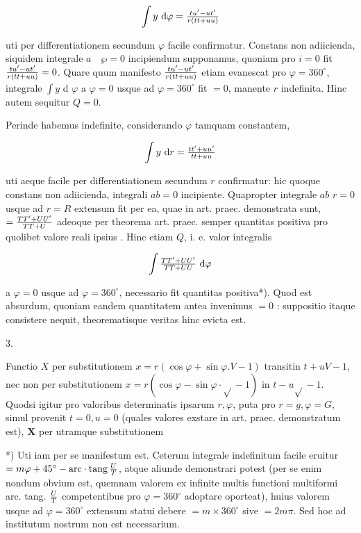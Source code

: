 \documentclass[twoside,12pt, showframe]{memoir}
\let\oldfrac\frac
\def\frac#1#2{\mathchoice{\tfrac{#1}{#2}}{\oldfrac{#1}{#2}}{\genfrac{}{}{}{2}{#1}{#2\mathstrut}}{\genfrac{}{}{}{3}{#1}{#2\mathstrut}}}
\begin{document}
\[
\int y \mathrm{~d} \varphi=\frac{t u^{\prime}-u t^{\prime}}{r(t t+u u)}
\]

uti per differentiationem secundum \(\varphi\) facile confirmatur. Constans non adiicienda, siquidem integrale \(a \quad \wp=0\) incipiendum supponamus, quoniam pro \(i=0\) fit \(\frac{t u^{\prime}-u t^{\prime}}{r(t t+u u)}=0\). Quare quum manifesto \(\frac{t u^{\prime}-u t^{\prime}}{r(t t+u u)}\) etiam evanescat pro \(\varphi=360^{\circ}\), integrale \(\int y\) d \(\varphi\) a \(\varphi=0\) usque ad \(\varphi=360^{\circ}\) fit \(=0\), manente \(r\) indefinita. Hinc autem sequitur \(Q=0\).

Perinde habemus indefinite, considerando \(\varphi\) tamquam constantem,

\[
\int y \mathrm{~d} r=\frac{t t^{\prime}+u u^{\prime}}{t t+u u}
\]

uti aeque facile per differentiationem secundum \(r\) confirmatur: hic quoque constans non adiicienda, integrali \(a b=0\) incipiente. Quapropter integrale \(a b\) \(r=0\) usque ad \(r=R\) extensum fit per ea, quae in art. praec. demonstrata sunt, \(=\frac{T T^{\prime}+U U^{\prime}}{T T+U}\) adeoque per theorema art. praec. semper quantitas positiva pro quolibet valore reali ipsius \(\). Hinc etiam \(Q\), i. e. valor integralis

\[
\int \frac{T T^{\prime}+U U^{\prime}}{T T+U U} \mathrm{~d} \varphi
\]

a \(\varphi=0\) usque ad \(\varphi=360^{\circ}\), necessario fit quantitas positiva*). Quod est absurdum, quoniam eandem quantitatem antea invenimus \(=0\) : suppositio itaque consistere nequit, theorematisque veritas hinc evicta est.

3.

Functio \(X\) per substitutionem \(x=r(\cos \varphi+\sin \varphi . V-1)\) transitin \(t+u V-1\), nec non per substitutionem \(x=r(\cos \varphi-\sin \varphi \cdot \sqrt{ }-1)\) in \(t-u \sqrt{ }-1\). Quodsi igitur pro valoribus determinatis ipsarum \(r, \varphi\), puta pro \(r=g, \varphi=G\), simul provenit \(t=0, u=0\) (quales valores exstare in art. praec. demonstratum est), \(\boldsymbol{X}\) per utramque substitutionem

*) Uti iam per se manifestum est. Ceterum integrale indefinitum facile eruitur \(=m \varphi+45^{\circ}-\operatorname{arc\cdot tang} \frac{U}{T}\), atque aliunde demonstrari potest (per se enim nondum obvium est, quemnam valorem ex infinite multis functioni multiformi arc. tang. \(\frac{U}{T}\) competentibus pro \(\varphi=360^{\circ}\) adoptare oporteat), huius valorem usque ad \(\varphi=360^{\circ}\) extensum statui debere \(=m \times 360^{\circ}\) sive \(=2 m \pi\). Sed hoc ad institutum nostrum non est necessarium.
\end{document}
